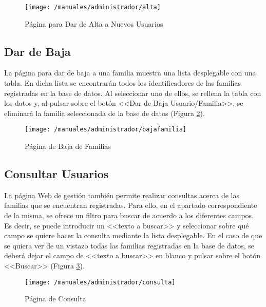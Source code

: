 \begin{figure}[!h]
	\begin{center}
		\texttt{[image: /manuales/administrador/alta]}
		\caption{Página para Dar de Alta a Nuevos Usuarios}
		\label{fig:altaweb}
	\end{center}
\end{figure}

\clearpage

\subsection*{Dar de Baja}
La página para dar de baja a una familia muestra una lista desplegable con una tabla. En dicha lista se encontrarán todos los identificadores de las familias registradas en la base de datos. Al seleccionar uno de ellos, se rellena la tabla con los datos y, al pulsar sobre el botón <<Dar de Baja Usuario/Familia>>, se eliminará la familia seleccionada de la base de datos (Figura \ref{fig:bajaweb}).

\begin{figure}[!h]
	\begin{center}
		\texttt{[image: /manuales/administrador/bajafamilia]}
		\caption{Página de Baja de Familias}
		\label{fig:bajaweb}
	\end{center}
\end{figure}

\subsection*{Consultar Usuarios}
La página Web de gestión también permite realizar consultas acerca de las familias que se encuentran registradas. Para ello, en el apartado correspondiente de la misma, se ofrece un filtro para buscar de acuerdo a los diferentes campos. Es decir, se puede introducir un <<texto a buscar>> y seleccionar sobre qué campo se quiere hacer la consulta mediante la lista desplegable. En el caso de que se quiera ver de un vistazo todas las familias registradas en la base de datos, se deberá dejar el campo de <<texto a buscar>> en blanco y pulsar sobre el botón <<Buscar>> (Figura \ref{fig:consultaweb}).

\begin{figure}[!h]
	\begin{center}
		\texttt{[image: /manuales/administrador/consulta]}
		\caption{Página de Consulta}
		\label{fig:consultaweb}
	\end{center}
\end{figure}

